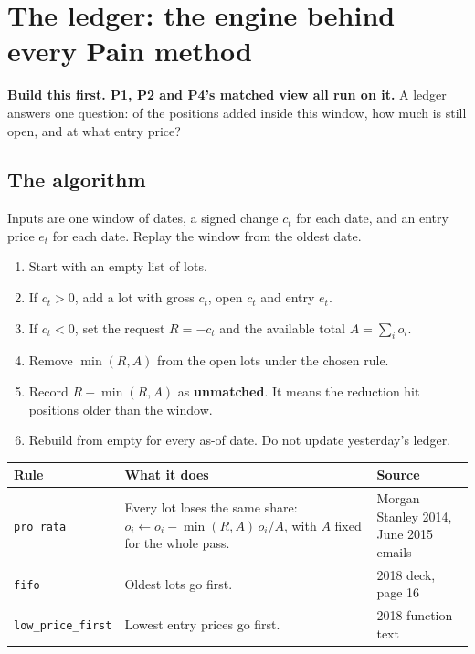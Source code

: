 \documentclass[11pt,a4paper]{article}
\newcommand{\code}[1]{\nolinkurl{#1}}
\newcommand{\sublabel}[1]{\par\vspace{3pt}\needspace{3\baselineskip}{\sffamily\small\bfseries #1}\par\nopagebreak[4]\vspace{1pt}}
\begin{document}
\section{The ledger: the engine behind every Pain method}\label{sec:ledger}

\textbf{Build this first. P1, P2 and P4's matched view all run on it.} A ledger answers one question: of the positions added inside this window, how much is still open, and at what entry price?

\subsection{The algorithm}

Inputs are one window of dates, a signed change $c_t$ for each date, and an entry price $e_t$ for each date. Replay the window from the oldest date.

\begin{enumerate}
\item Start with an empty list of lots.
\item If $c_t > 0$, add a lot with gross $c_t$, open $c_t$ and entry $e_t$.
\item If $c_t < 0$, set the request $R = -c_t$ and the available total $A = \sum_i o_i$.
\item Remove $\min(R, A)$ from the open lots under the chosen rule.
\item Record $R - \min(R, A)$ as \textbf{unmatched}. It means the reduction hit positions older than the window.
\item Rebuild from empty for every as-of date. Do not update yesterday's ledger.
\end{enumerate}

\sublabel{The removal rules}
\small
\begin{tabularx}{\linewidth}{@{}lXl@{}}
\toprule
Rule & What it does & Source \\
\midrule
\code{pro_rata} & Every lot loses the same share: $o_i \leftarrow o_i - \min(R,A)\, o_i / A$, with $A$ fixed for the whole pass. & Morgan Stanley 2014, June 2015 emails \\
\code{fifo} & Oldest lots go first. & 2018 deck, page 16 \\
\code{low_price_first} & Lowest entry prices go first. & 2018 function text \\
\bottomrule
\end{tabularx}
\normalsize
\end{document}
